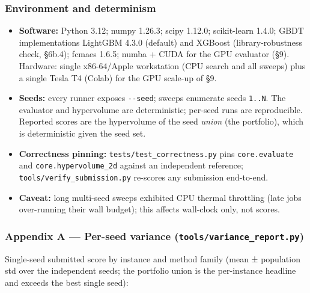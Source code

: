 \documentclass[
  11pt,
]{article}
\providecommand{\tightlist}{%
  \setlength{\itemsep}{0pt}\setlength{\parskip}{0pt}}
\begin{document}
\hypertarget{environment-and-determinism}{%
\subsubsection{Environment and
determinism}\label{environment-and-determinism}}

\begin{itemize}
\tightlist
\item
  \textbf{Software:} Python 3.12; numpy 1.26.3; scipy 1.12.0;
  scikit-learn 1.4.0; GBDT implementations LightGBM 4.3.0 (default) and
  XGBoost (library-robustness check, §6b.4); fcmaes 1.6.5; numba + CUDA
  for the GPU evaluator (§9). Hardware: single x86-64/Apple workstation
  (CPU search and all sweeps) plus a single Tesla T4 (Colab) for the GPU
  scale-up of §9.
\item
  \textbf{Seeds:} every runner exposes \texttt{-\/-seed}; sweeps
  enumerate seeds \texttt{1..N}. The evaluator and hypervolume are
  deterministic; per-seed runs are reproducible. Reported scores are the
  hypervolume of the seed \emph{union} (the portfolio), which is
  deterministic given the seed set.
\item
  \textbf{Correctness pinning:} \texttt{tests/test\_correctness.py} pins
  \texttt{core.evaluate} and \texttt{core.hypervolume\_2d} against an
  independent reference; \texttt{tools/verify\_submission.py} re-scores
  any submission end-to-end.
\item
  \textbf{Caveat:} long multi-seed sweeps exhibited CPU thermal
  throttling (late jobs over-running their wall budget); this affects
  wall-clock only, not scores.
\end{itemize}

\hypertarget{appendix-a-per-seed-variance-toolsvariance_report.py}{%
\subsubsection{\texorpdfstring{Appendix A --- Per-seed variance
(\texttt{tools/variance\_report.py})}{Appendix A --- Per-seed variance (tools/variance\_report.py)}}\label{appendix-a-per-seed-variance-toolsvariance_report.py}}

Single-seed submitted score by instance and method family (mean ±
population std over the independent seeds; the portfolio union is the
per-instance headline and exceeds the best single seed):
\end{document}
